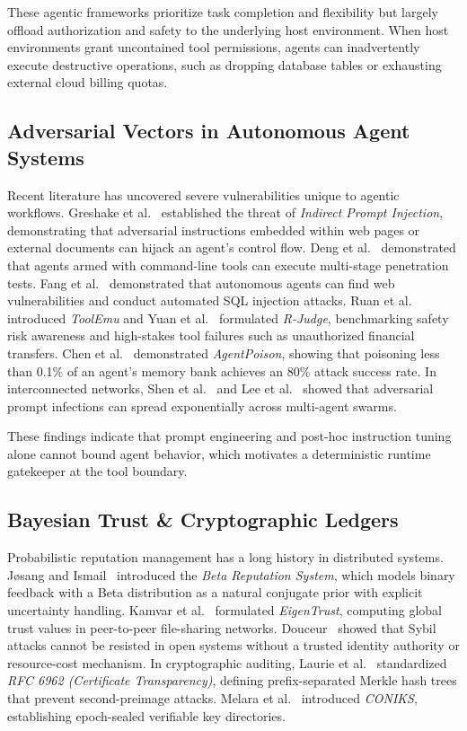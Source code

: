 \documentclass[manuscript, screen, review]{jair}
\begin{document}
These agentic frameworks prioritize task completion and flexibility but largely offload authorization and safety to the underlying host environment. When host environments grant uncontained tool permissions, agents can inadvertently execute destructive operations, such as dropping database tables or exhausting external cloud billing quotas.

\subsection{Adversarial Vectors in Autonomous Agent Systems}
Recent literature has uncovered severe vulnerabilities unique to agentic workflows. Greshake et al.~\cite{greshake2023not} established the threat of \emph{Indirect Prompt Injection}, demonstrating that adversarial instructions embedded within web pages or external documents can hijack an agent's control flow. Deng et al.~\cite{deng2024pentestgpt} demonstrated that agents armed with command-line tools can execute multi-stage penetration tests. Fang et al.~\cite{fang2024llm} demonstrated that autonomous agents can find web vulnerabilities and conduct automated SQL injection attacks. Ruan et al.~\cite{ruan2024identifying} introduced \emph{ToolEmu} and Yuan et al.~\cite{yuan2024rjudge} formulated \emph{R-Judge}, benchmarking safety risk awareness and high-stakes tool failures such as unauthorized financial transfers. Chen et al.~\cite{chen2024agentpoison} demonstrated \emph{AgentPoison}, showing that poisoning less than 0.1\% of an agent's memory bank achieves an 80\% attack success rate. In interconnected networks, Shen et al.~\cite{shen2024agent} and Lee et al.~\cite{lee2024prompt} showed that adversarial prompt infections can spread exponentially across multi-agent swarms.

These findings indicate that prompt engineering and post-hoc instruction tuning alone cannot bound agent behavior, which motivates a deterministic runtime gatekeeper at the tool boundary.

\subsection{Bayesian Trust \& Cryptographic Ledgers}
Probabilistic reputation management has a long history in distributed systems. J{\o}sang and Ismail~\cite{josang2002beta} introduced the \emph{Beta Reputation System}, which models binary feedback with a Beta distribution as a natural conjugate prior with explicit uncertainty handling. Kamvar et al.~\cite{kamvar2003eigentrust} formulated \emph{EigenTrust}, computing global trust values in peer-to-peer file-sharing networks. Douceur~\cite{douceur2002sybil} showed that Sybil attacks cannot be resisted in open systems without a trusted identity authority or resource-cost mechanism. In cryptographic auditing, Laurie et al.~\cite{laurie2013certificate} standardized \emph{RFC 6962 (Certificate Transparency)}, defining prefix-separated Merkle hash trees that prevent second-preimage attacks. Melara et al.~\cite{melara2015coniks} introduced \emph{CONIKS}, establishing epoch-sealed verifiable key directories.
\end{document}
